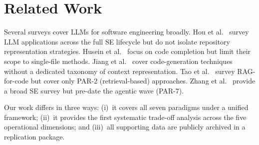 
\section{Related Work}
\label{sec:relatedwork}

Several surveys cover LLMs for software engineering broadly.
Hou et al.~\cite{hou2024llmse_slr} survey LLM applications across the full
SE lifecycle but do not isolate repository representation strategies.
Husein et al.~\cite{husein2025llmcompletion_slr} focus on code completion
but limit their scope to single-file methods.
Jiang et al.~\cite{jiang2026surveycodegen} cover code-generation techniques
without a dedicated taxonomy of context representation.
Tao et al.~\cite{tao2026ragsurvey} survey RAG-for-code but cover only PAR-2
(retrieval-based) approaches.
Zhang et al.~\cite{zhang2026surveyse} provide a broad SE survey but pre-date
the agentic wave (PAR-7).

Our work differs in three ways: (i)~it covers all seven paradigms under a
unified framework; (ii)~it provides the first systematic trade-off analysis
across the five operational dimensions; and (iii)~all supporting data are
publicly archived in a replication package.
